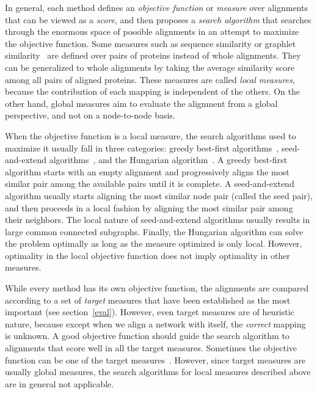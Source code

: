 \documentclass{bioinfo}
\begin{document}
In general, each method defines an \textit{objective function} or \textit{measure} over alignments that can be viewed as a \textit{score}, and then proposes a \textit{search algorithm} that searches through the enormous space of possible alignments in an attempt to maximize the objective function. Some measures such as sequence similarity %
or graphlet similarity~\citep{GRAAL} are defined over pairs of proteins instead of whole alignments. They can be generalized to whole alignments by taking the average similarity score among all pairs of aligned proteins. These measures are called \textit{local measures}, because the contribution of each mapping is independent of the others. On the other hand, global measures aim to evaluate the alignment from a global perspective, and not on a node-to-node basis.

When the objective function is a local measure, the search algorithms used to maximize it usually fall in three categories: greedy best-first algorithms~\citep{NETAL,GREAT}, seed-and-extend algorithms~\citep{GRAAL,MIGRAAL,SPINAL,HubAlign}, and the Hungarian algorithm~\citep{HGRAAL,GREAT}. A greedy best-first algorithm starts with an empty alignment and progressively aligns the most similar pair among the available pairs until it is complete. A seed-and-extend algorithm usually starts aligning the most similar node pair (called the seed pair), and then proceeds in a local fashion by aligning the most similar pair among their neighbors. The local nature of seed-and-extend algorithms usually results in large common connected subgraphs. Finally, the Hungarian algorithm can solve the problem optimally as long as the measure optimized is only local. However, optimality in the local objective function does not imply optimality in other measures.

While every method has its own objective function, the alignments are compared according to a set of \textit{target} measures that have been established as the most important (see section~\ref{eval}). However, even target measures are of heuristic nature, because except when we align a network with itself, the \textit{correct} mapping is unknown. A good objective function should guide the search algorithm to alignments that score well in all the target measures. Sometimes the objective function can be one of the target measures~\citep{MAGNA}. However, since target measures are usually global measures, the search algorithms for local measures described above are in general not applicable.
\end{document}
